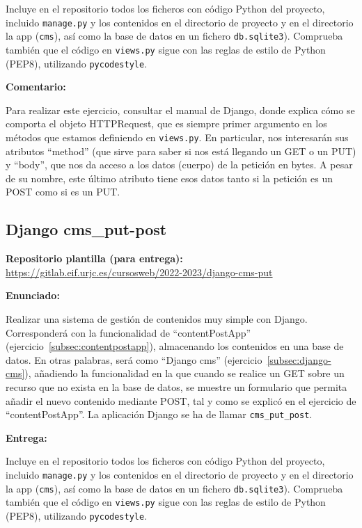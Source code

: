 Incluye en el repositorio todos los ficheros con código Python del proyecto, incluido \texttt{manage.py} y los contenidos en el directorio de proyecto y en el directorio la app (\texttt{cms}), así como la base de datos en un fichero \texttt{db.sqlite3}). Comprueba también que el código en \texttt{views.py} sigue con las reglas de estilo de Python (PEP8), utilizando \texttt{pycodestyle}.


\textbf{Comentario:}

Para realizar este ejercicio, consultar el manual de Django, donde explica cómo se comporta el objeto HTTPRequest, que es siempre primer argumento en los métodos que estamos definiendo en \texttt{views.py}. En particular, nos interesarán sus atributos ``method'' (que sirve para saber si nos está llegando un GET o un PUT) y ``body'', que nos da acceso a los datos (cuerpo) de la petición en bytes. A pesar de su nombre, este último atributo tiene esos datos tanto si la petición es un POST como si es un PUT. 

\subsection{Django cms\_put-post}
\label{subsec:django-cms-put-post}

\textbf{Repositorio plantilla (para entrega):} \\
\url{https://gitlab.eif.urjc.es/cursosweb/2022-2023/django-cms-put}

\textbf{Enunciado:}

Realizar una sistema de gestión de contenidos muy simple con Django. Corresponderá con la funcionalidad de ``contentPostApp'' (ejercicio~\ref{subsec:contentpostapp}), almacenando los contenidos en una base de datos. En otras palabras, será como ``Django cms'' (ejercicio~\ref{subsec:django-cms}), añadiendo la funcionalidad en la que cuando se realice un GET sobre un recurso que no exista en la base de datos, se muestre un formulario que permita añadir el nuevo contenido mediante POST, tal y como se explicó en el ejercicio de ``contentPostApp''. La aplicación Django se ha de llamar \texttt{cms\_put\_post}.

\textbf{Entrega:}

Incluye en el repositorio todos los ficheros con código Python del proyecto, incluido \texttt{manage.py} y los contenidos en el directorio de proyecto y en el directorio la app (\texttt{cms}), así como la base de datos en un fichero \texttt{db.sqlite3}). Comprueba también que el código en \texttt{views.py} sigue con las reglas de estilo de Python (PEP8), utilizando \texttt{pycodestyle}.


